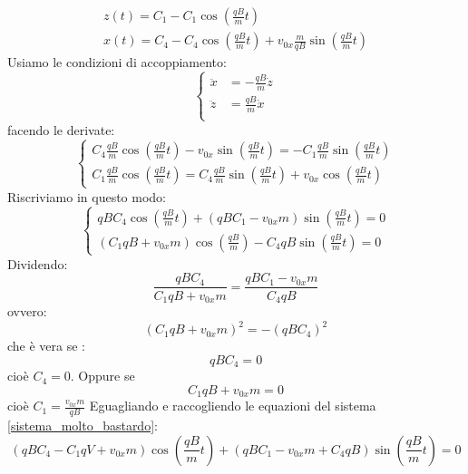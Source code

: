 \begin{gather}
	z(t)=C_1-C_1\cos\left(\frac{qB}{m}t\right)\\
	x(t)=C_4-C_4\cos\left(\frac{qB}{m}t\right)+v_{0x}\frac{m}{qB}\sin\left(\frac{qB}{m}t\right)
\end{gather}
Usiamo le condizioni di accoppiamento:
\begin{equation}
	\left\{
	\begin{aligned}
		\ddot x & =-\frac{qB}{m}\dot z \\
		\ddot z & =\frac{qB}{m}\dot x  \\
	\end{aligned}
	\right.
\end{equation}
facendo le derivate:
\begin{equation}
	\left\{
	\begin{aligned}
		C_4\frac{qB}{m}\cos\left(\frac{qB}{m}t\right)-v_{0x}\sin\left(\frac{qB}{m}t\right)=-C_1\frac{qB}{m}\sin\left(\frac{qB}{m}t\right) \\
		C_1\frac{qB}{m}\cos\left(\frac{qB}{m}t\right)=C_4\frac{qB}{m}\sin\left(\frac{qB}{m}t\right)+v_{0x}\cos\left(\frac{qB}{m}t\right)
	\end{aligned}
	\right.
\end{equation}
Riscriviamo in questo modo:
\begin{equation}
	\left\{
	\begin{aligned}
		qBC_4\cos\left(\frac{qB}{m}t\right)+\left(qBC_1-v_{0x}m\right)\sin\left(\frac{qB}{m}t\right)=0 \\
		\left(C_1qB+v_{0x}m\right)\cos\left(\frac{qB}{m}\right)-C_4qB\sin\left(\frac{qB}{m}t\right)=0
	\end{aligned}
	\label{sistema_molto_bastardo}
	\right.
\end{equation}
Dividendo:
\begin{equation}
	\frac{qBC_4}{C_1qB+v_{0x}m}=\frac{qBC_1-v_{0x}m}{C_4qB}
\end{equation}
ovvero:
\begin{equation}
	\left(C_1qB+v_{0x}m\right)^2=-\left(qBC_4\right)^2
\end{equation}
che è vera se :
\begin{equation}
	qBC_4=0
\end{equation}
cioè $C_4=0$. Oppure se
\begin{equation}
	C_1qB+v_{0x}m=0
\end{equation}
cioè $C_1=\frac{v_{0x}m}{qB}$
Eguagliando e raccogliendo le equazioni del sistema \eqref{sistema_molto_bastardo}:
\begin{equation}
	\left(qBC_4-C_1qV+v_{0x}m\right)\cos\left(\frac{qB}{m}t\right)+\left(qBC_1-v_{0x}m+C_4qB\right)\sin\left(\frac{qB}{m}t\right)=0
\end{equation}
